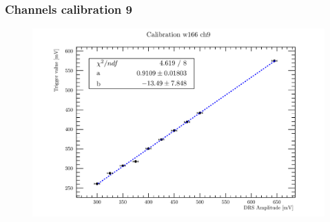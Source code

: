 
\begin{frame} [fragile]
\small
	\frametitle{Channels calibration 9}
    		\begin{figure}
		 \centering
			\includegraphics[scale=0.5]{figures/ch9.pdf}
		\end{figure}  
\end{frame}